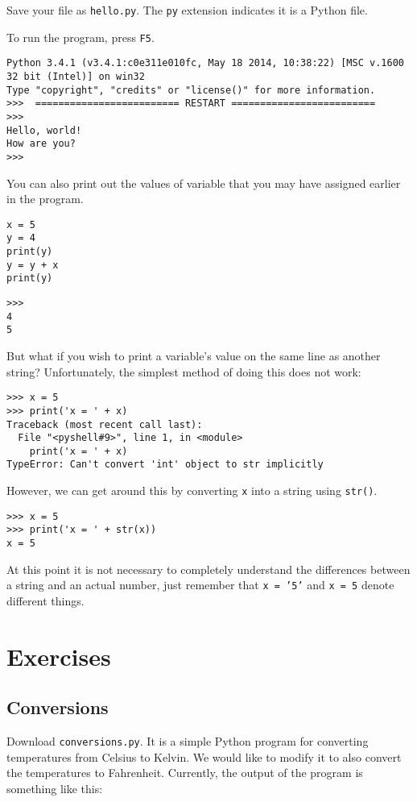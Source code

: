 \documentclass[12pt]{article}
\begin{document}
Save your file as \texttt{hello.py}. The \texttt{py} extension indicates it is a Python file.

To run the program, press \texttt{F5}.

\begin{lstlisting}[style=bash]
Python 3.4.1 (v3.4.1:c0e311e010fc, May 18 2014, 10:38:22) [MSC v.1600 32 bit (Intel)] on win32
Type "copyright", "credits" or "license()" for more information.
>>>  ========================= RESTART =========================
>>> 
Hello, world!
How are you?
>>> 
\end{lstlisting}

You can also print out the values of variable that you may have assigned earlier in the program.

\begin{lstlisting}[style=c]
x = 5
y = 4
print(y)
y = y + x
print(y)
\end{lstlisting}

\begin{lstlisting}[style=bash]
>>> 
4
5
\end{lstlisting}

But what if you wish to print a variable's value on the same line as another string? Unfortunately, the simplest method of doing this does not work:

\begin{lstlisting}[style=bash]
>>> x = 5
>>> print('x = ' + x)
Traceback (most recent call last):
  File "<pyshell#9>", line 1, in <module>
    print('x = ' + x)
TypeError: Can't convert 'int' object to str implicitly
\end{lstlisting}

However, we can get around this by converting \texttt{x} into a string using \texttt{str()}.

\begin{lstlisting}[style=bash]
>>> x = 5
>>> print('x = ' + str(x))
x = 5
\end{lstlisting}

At this point it is not necessary to completely understand the differences between a string and an actual number, just remember that \texttt{x = '5'} and \texttt{x = 5} denote different things.

\pagebreak

\section{Exercises}
\subsection{Conversions}
Download \texttt{conversions.py}. It is a simple Python program for converting temperatures from Celsius to Kelvin. We would like to modify it to also convert the temperatures to Fahrenheit. Currently, the output of the program is something like this:
\end{document}
